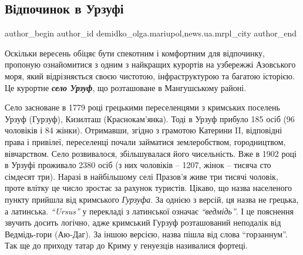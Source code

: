  
 
 
 
 
 
\subsection{Відпочинок в Урзуфі}
\label{sec:16_09_2020.stz.news.ua.mrpl_city.1.vidpochynok_v_urzufi}
 
\ifcmt
 author_begin
   author_id demidko_olga.mariupol,news.ua.mrpl_city
 author_end
\fi

Оскільки вересень обіцяє бути спекотним і комфортним для відпочинку, пропоную
ознайомитися з одним з найкращих курортів на узбережжі Азовського моря, який
відрізняється своєю чистотою, інфраструктурою та багатою історією. Це курортне
\emph{\textbf{село Урзуф}}, що розташоване в Мангушському районі.


Село засноване в 1779 році грецькими переселенцями з кримських поселень Урзуф
(Гурзуф), Кизилташ (Краснокам'янка). Тоді в Урзуф прибуло 185 осіб (96
чоловіків і 84 жінки). Отримавши, згідно з грамотою Катерини II, відповідні
права і привілеї, переселенці почали займатися землеробством, городництвом,
вівчарством. Село розвивалося, збільшувалася його чисельність. Вже в 1902 році
в Урзуфі проживало 2380 осіб (з них чоловіків – 1207, жінок – тисяча сто
сімдесят три). Наразі в найбільшому селі Празов'я живе три тисячі чоловік,
проте влітку це число зростає за рахунок туристів. Цікаво, що назва населеного
пункту прийшла від кримського \emph{Гурзуфа}. За однією з версій, ця назва не грецька,
а латинська. \emph{\enquote{Ursus}} у перекладі з латинської означає \emph{\enquote{ведмідь}}. І це пояснення
звучить досить логічно, адже кримський Гурзуф розташований неподалік від
Ведмідь-гори (Аю-Даг). За іншою версією, назва пішла від слова \enquote{горзаннум}. Так
ще до приходу татар до Криму у генуезців називалися фортеці.

